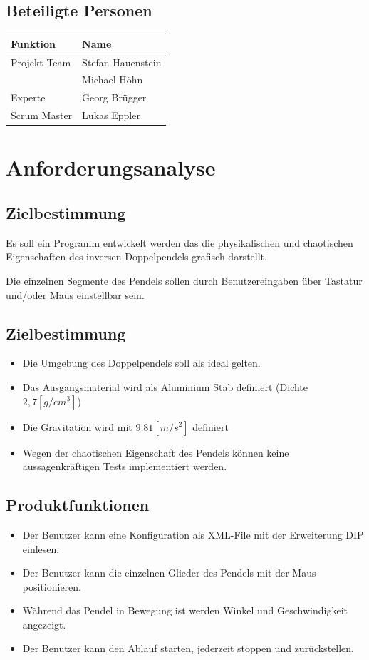 \documentclass[12pt]{article}
\numberwithin{equation}{subsection}
\begin{document}
\subsection{Beteiligte Personen}
\begin{tabularx}{\textwidth}{|X|X|}
	\hline
	\textbf{Funktion} & \textbf{Name} \\
	\hline
	Projekt Team      & Stefan Hauenstein \\
	                  & Michael Höhn \\
	\hline
	Experte           & Georg Brügger\\
	\hline
	Scrum Master      & Lukas Eppler\\
	\hline
\end{tabularx}

\newpage
\section{Anforderungsanalyse}
\subsection{Zielbestimmung}
Es soll ein Programm entwickelt werden das die physikalischen und chaotischen Eigenschaften des inversen Doppelpendels grafisch darstellt.

Die einzelnen Segmente des Pendels sollen durch Benutzereingaben über Tastatur und/oder Maus einstellbar sein.

\subsection{Zielbestimmung}
\begin{itemize}
	\item Die Umgebung des Doppelpendels soll als ideal gelten.
	\item Das Ausgangsmaterial wird als Aluminium Stab definiert (Dichte $2,7 [g/cm^3]$)
	\item Die Gravitation wird mit $9.81 [m/s^2]$ definiert
	\item Wegen der chaotischen Eigenschaft des Pendels können keine aussagenkräftigen Tests implementiert werden.
\end{itemize}

\subsection{Produktfunktionen}
\begin{itemize}
	\item Der Benutzer kann eine Konfiguration als XML-File mit der Erweiterung DIP einlesen.
	\item Der Benutzer kann die einzelnen Glieder des Pendels mit der Maus positionieren.
	\item Während das Pendel in Bewegung ist werden Winkel und Geschwindigkeit angezeigt.
	\item Der Benutzer kann den Ablauf starten, jederzeit stoppen und zurückstellen.
\end{itemize}
\end{document}
